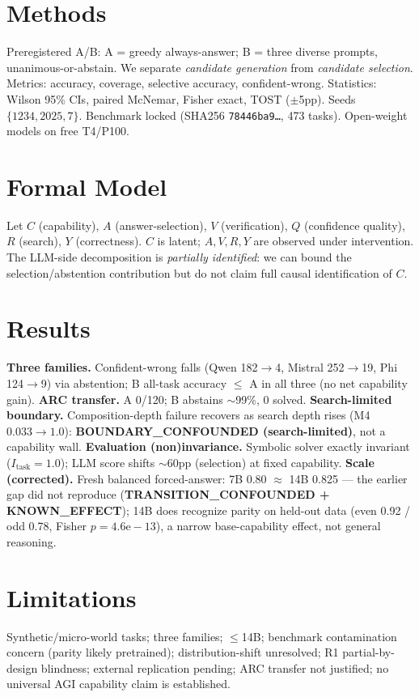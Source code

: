\documentclass{article}
\begin{document}
\section{Methods}
Preregistered A/B: A = greedy always-answer; B = three diverse prompts, unanimous-or-abstain. We separate \emph{candidate generation} from \emph{candidate selection}. Metrics: accuracy, coverage, selective accuracy, confident-wrong. Statistics: Wilson 95\% CIs, paired McNemar, Fisher exact, TOST ($\pm$5pp). Seeds $\{1234,2025,7\}$. Benchmark locked (SHA256 \texttt{78446ba9\ldots}, 473 tasks). Open-weight models on free T4/P100.

\section{Formal Model}
Let $C$ (capability), $A$ (answer-selection), $V$ (verification), $Q$ (confidence quality), $R$ (search), $Y$ (correctness). $C$ is latent; $A,V,R,Y$ are observed under intervention. The LLM-side decomposition is \emph{partially identified}: we can bound the selection/abstention contribution but do not claim full causal identification of $C$.

\section{Results}
\textbf{Three families.} Confident-wrong falls (Qwen 182$\to$4, Mistral 252$\to$19, Phi 124$\to$9) via abstention; B all-task accuracy $\le$ A in all three (no net capability gain). \textbf{ARC transfer.} A 0/120; B abstains $\sim$99\%, 0 solved. \textbf{Search-limited boundary.} Composition-depth failure recovers as search depth rises (M4 $0.033\to1.0$): \textbf{BOUNDARY\_CONFOUNDED (search-limited)}, not a capability wall. \textbf{Evaluation (non)invariance.} Symbolic solver exactly invariant ($I_{\mathrm{task}}{=}1.0$); LLM score shifts $\sim$60pp (selection) at fixed capability. \textbf{Scale (corrected).} Fresh balanced forced-answer: 7B 0.80 $\approx$ 14B 0.825 --- the earlier gap did not reproduce (\textbf{TRANSITION\_CONFOUNDED + KNOWN\_EFFECT}); 14B does recognize parity on held-out data (even 0.92 / odd 0.78, Fisher $p{=}4.6\mathrm{e}{-}13$), a narrow base-capability effect, not general reasoning.

\section{Limitations}
Synthetic/micro-world tasks; three families; $\le$14B; benchmark contamination concern (parity likely pretrained); distribution-shift unresolved; R1 partial-by-design blindness; external replication pending; ARC transfer not justified; no universal AGI capability claim is established.
\end{document}
